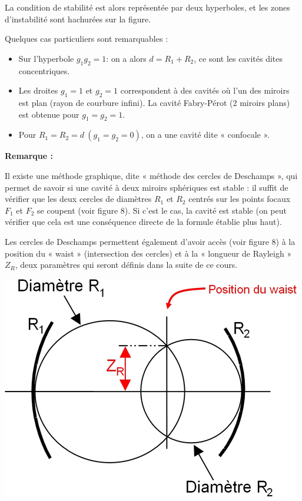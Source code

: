 \documentclass{book}
\begin{document}
 La condition de stabilité est alors représentée par deux hyperboles, et les zones d'instabilité sont hachurées sur la figure.

Quelques cas particuliers sont remarquables :
\begin{itemize}
    \item Sur l'hyperbole $g_1g_2=1$: on a alors $d=R_1+R_2$, ce sont les cavités dites concentriques.
    \item Les droites $g_1=1$ et $g_2=1$ correspondent à des cavités où l'un des miroirs est plan (rayon de courbure infini). La cavité Fabry-Pérot (2 miroirs plans) est obtenue pour $g_1=g_2=1$.
    \item Pour $R_1 = R_2 = d\ (g_1 = g_2 = 0)$, on a une cavité dite « confocale ».
\end{itemize}

\textbf{\color{remarque1}Remarque :}  
\begin{mdframed}[linecolor=remarque1, backgroundcolor=remarque2]

Il existe une méthode graphique, dite « méthode des cercles de Deschamps », qui permet de savoir si une cavité à deux miroirs sphériques est stable : il suffit de vérifier que les deux cercles de diamètres $R_1$ et $R_2$ centrés sur les points focaux $F_1$ et $F_2$ se coupent (voir figure 8). Si c'est le cas, la cavité est stable (on peut vérifier que cela est une conséquence directe de la formule établie plus haut).

Les cercles de Deschamps permettent également d'avoir accès (voir figure 8) à la position du « waist » (intersection des cercles) et à la « longueur de Rayleigh » $Z_R$, deux paramètres qui seront définis dans la suite de ce cours.

{\centering
\includegraphics[scale=1.7]{images/fig08.jpg}
\par}

\end{mdframed}
\end{document}
